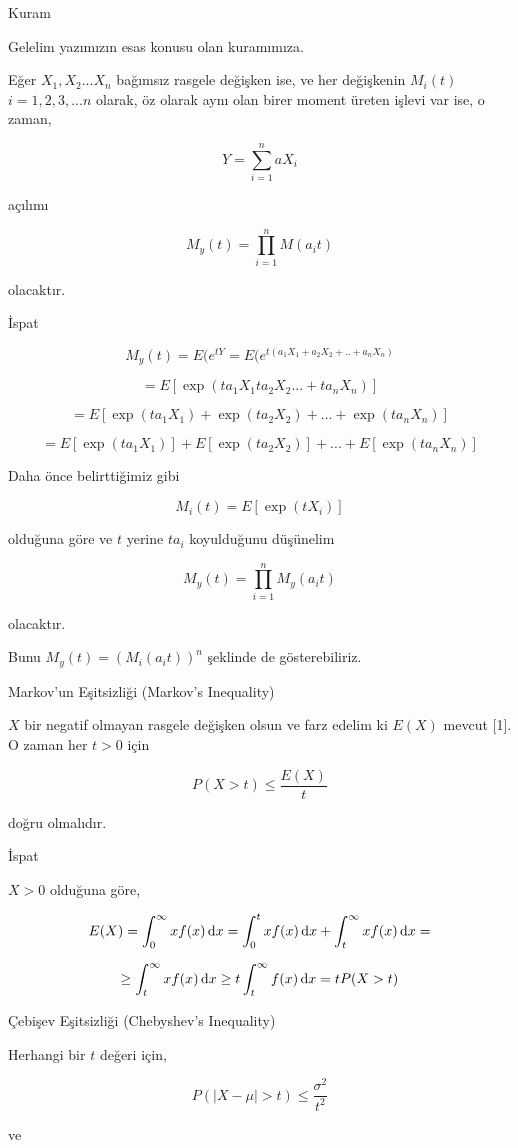 \documentclass[12pt,fleqn]{article}\usepackage{../../common}
\begin{document}
Kuram

Gelelim yazımızın esas konusu olan kuramımıza.

Eğer $X_1, X_2...X_n$ bağımsız rasgele değişken ise, ve her değişkenin
$M_i(t)$ $i=1,2,3,...n$ olarak, öz olarak aynı olan birer moment üreten
işlevi var ise, o zaman,

$$ Y = \sum_{i=1}^n  aX_i $$

açılımı

$$ M_y(t) = \prod_{i=1}^n M(a_i t) $$

olacaktır. 

İspat

$$ M_y(t) = E(e^{tY}=E(e^{t(a_1X_1+a_2X_2+..+a_nX_n)} $$

$$ = E[\exp(ta_1 X_1 ta_2X_2...+ta_nX_n)] $$

$$ = E[\exp(ta_1X_1)+\exp(ta_2X_2)+ ... + \exp(ta_nX_n)] $$

$$ = E[\exp(ta_1X_1)]+E[\exp(ta_2X_2)]+ ... + E[\exp(ta_nX_n)]$$

Daha önce belirttiğimiz gibi

$$ M_i(t) = E[\exp(tX_i)] $$

olduğuna göre ve $t$ yerine $ta_i$ koyulduğunu düşünelim

$$ M_y(t) = \prod_{i=1}^n M_y(a_it) $$

olacaktır. 

Bunu $M_y(t)= (M_i(a_it))^n$ şeklinde de gösterebiliriz. 

\newpage

Markov'un Eşitsizliği (Markov's Inequality)

$X$ bir negatif olmayan rasgele değişken olsun ve farz edelim ki $E(X)$
mevcut [1]. O zaman her $t > 0$ için

$$ P(X>t) \le \frac{E(X)}{t}$$

doğru olmalıdır. 

İspat

$X > 0$ olduğuna göre, 

$$ 
E(X) 
= \int _{0}^{\infty} x f(x) \,\mathrm{d} x 
= \int _{0}^{t} x f(x) \,\mathrm{d} x + \int _{t}^{\infty} x f(x) \,\mathrm{d} x =
$$

$$ 
\ge \int _{t}^{\infty} x f(x) \,\mathrm{d} x \ge t \int _{t}^{\infty} f(x) \,\mathrm{d} x
= t P(X > t)
$$

Çebişev Eşitsizliği (Chebyshev's Inequality)

Herhangi bir $t$ değeri için, 

$$ P(|X-\mu| > t) \le \frac{\sigma^2}{t^2} $$

ve 
\end{document}

